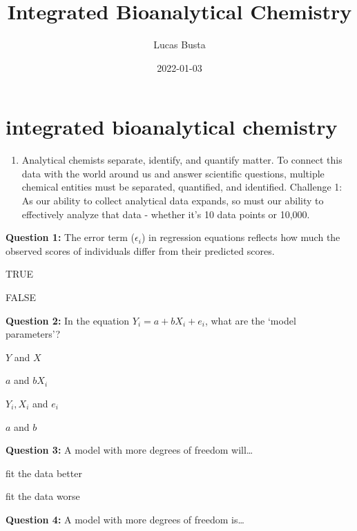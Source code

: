 \documentclass[
]{krantz}
\title{Integrated Bioanalytical Chemistry}
\author{Lucas Busta}
\date{2022-01-03}
\providecommand{\tightlist}{%
  \setlength{\itemsep}{0pt}\setlength{\parskip}{0pt}}
\begin{document}
\maketitle

{
\setcounter{tocdepth}{2}
\tableofcontents
}
\hypertarget{integrated-bioanalytical-chemistry}{%
\section*{integrated bioanalytical chemistry}\label{integrated-bioanalytical-chemistry}}

\begin{enumerate}
\def\labelenumi{\arabic{enumi}.}
\tightlist
\item
  Analytical chemists separate, identify, and quantify matter. To connect this data with the world around us and answer scientific questions, multiple chemical entities must be separated, quantified, and identified. Challenge 1: As our ability to collect analytical data expands, so must our ability to effectively analyze that data - whether it's 10 data points or 10,000.
\end{enumerate}

\textbf{Question 1:}
The error term (\(\epsilon_i\)) in regression equations reflects how much the observed scores of individuals differ from their predicted scores.

TRUE

FALSE

\hypertarget{collapseExample1}{}
\hypertarget{answerFeedback1}{}

\textbf{Question 2:}
In the equation \(Y_i = a + bX_i + e_i\), what are the `model parameters'?

\(Y\) and \(X\)

\(a\) and \(bX_i\)

\(Y_i, X_i\) and \(e_i\)

\(a\) and \(b\)

\hypertarget{collapseExample2}{}
\hypertarget{answerFeedback2}{}

\textbf{Question 3:}
A model with more degrees of freedom will\ldots{}

fit the data better

fit the data worse

\hypertarget{collapseExample3}{}
\hypertarget{answerFeedback3}{}

\textbf{Question 4:}
A model with more degrees of freedom is\ldots{}
\end{document}
